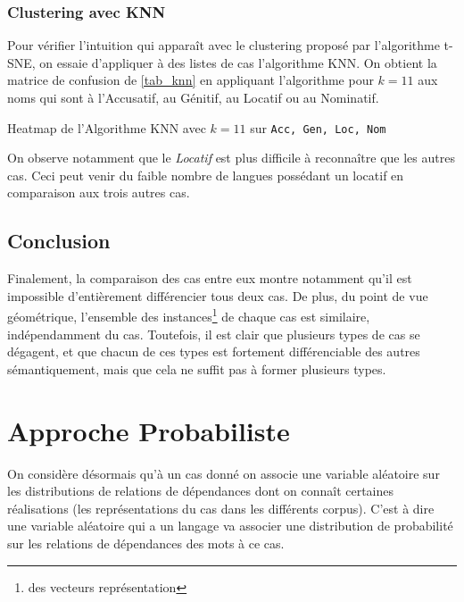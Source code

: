 \documentclass{cours}
\begin{document}
\subsubsection{Clustering avec KNN}\label{subsub:knn}
Pour vérifier l'intuition qui apparaît avec le clustering proposé par l'algorithme t-SNE, on essaie d'appliquer à des listes de cas l'algorithme KNN.
On obtient la matrice de confusion de \ref{tab_knn} en appliquant l'algorithme pour $k = 11$ aux noms qui sont à l'Accusatif, au Génitif, au Locatif ou au Nominatif.
\begin{table}
	\centering
	\pgfplotsset{colormap/jet}
	\caption{Heatmap de l'Algorithme KNN avec $k = 11$ sur \texttt{Acc, Gen, Loc, Nom}}
	\label{tab_knn}
\end{table}

On observe notamment que le \emph{Locatif} est plus difficile à reconnaître que les autres cas. Ceci peut venir du faible nombre de langues possédant un locatif en comparaison aux trois autres cas.

\subsection{Conclusion}
Finalement, la comparaison des cas entre eux montre notamment qu'il est impossible d'entièrement différencier tous deux cas.
De plus, du point de vue géométrique, l'ensemble des instances\footnote{des vecteurs représentation} de chaque cas est similaire, indépendamment du cas.
Toutefois, il est clair que plusieurs types de cas se dégagent, et que chacun de ces types est fortement différenciable des autres sémantiquement, mais que cela ne suffit pas à former plusieurs types.

\section{Approche Probabiliste}\label{sec:probas}
On considère désormais qu'à un cas donné on associe une variable aléatoire sur les distributions de relations de dépendances dont on connaît certaines réalisations (les représentations du cas dans les différents corpus).
C'est à dire une variable aléatoire qui a un langage va associer une distribution de probabilité sur les relations de dépendances des mots à ce cas.
\end{document}
